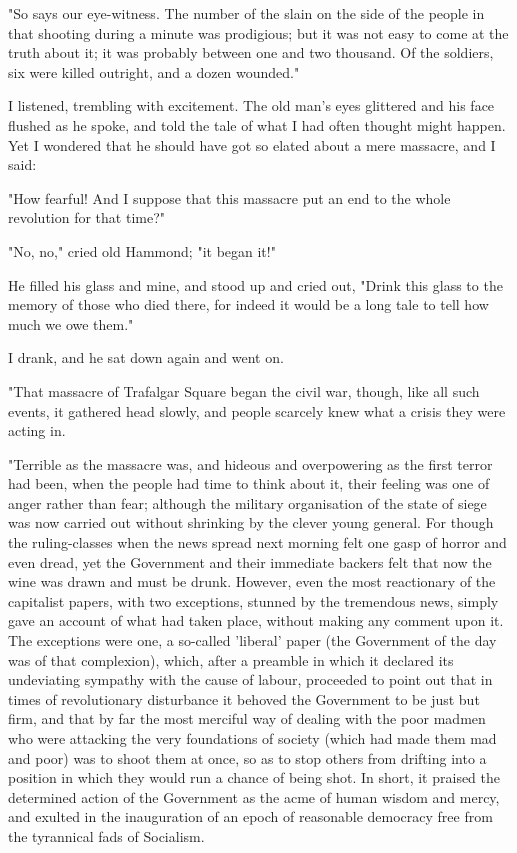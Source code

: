 "So says our eye-witness. The number of the slain on the side of the
people in that shooting during a minute was prodigious; but it was not
easy to come at the truth about it; it was probably between one and two
thousand. Of the soldiers, six were killed outright, and a dozen
wounded."

I listened, trembling with excitement. The old man's eyes glittered and
his face flushed as he spoke, and told the tale of what I had often
thought might happen. Yet I wondered that he should have got so elated
about a mere massacre, and I said:

"How fearful! And I suppose that this massacre put an end to the whole
revolution for that time?"

"No, no," cried old Hammond; "it began it!"

He filled his glass and mine, and stood up and cried out, "Drink this
glass to the memory of those who died there, for indeed it would be a
long tale to tell how much we owe them."

I drank, and he sat down again and went on.

"That massacre of Trafalgar Square began the civil war, though, like all
such events, it gathered head slowly, and people scarcely knew what a
crisis they were acting in.

"Terrible as the massacre was, and hideous and overpowering as the first
terror had been, when the people had time to think about it, their
feeling was one of anger rather than fear; although the military
organisation of the state of siege was now carried out without shrinking
by the clever young general. For though the ruling-classes when the news
spread next morning felt one gasp of horror and even dread, yet the
Government and their immediate backers felt that now the wine was drawn
and must be drunk. However, even the most reactionary of the capitalist
papers, with two exceptions, stunned by the tremendous news, simply gave
an account of what had taken place, without making any comment upon it.
The exceptions were one, a so-called 'liberal' paper (the Government of
the day was of that complexion), which, after a preamble in which it
declared its undeviating sympathy with the cause of labour, proceeded to
point out that in times of revolutionary disturbance it behoved the
Government to be just but firm, and that by far the most merciful way of
dealing with the poor madmen who were attacking the very foundations of
society (which had made them mad and poor) was to shoot them at once, so
as to stop others from drifting into a position in which they would run
a chance of being shot. In short, it praised the determined action of
the Government as the acme of human wisdom and mercy, and exulted in the
inauguration of an epoch of reasonable democracy free from the
tyrannical fads of Socialism.

